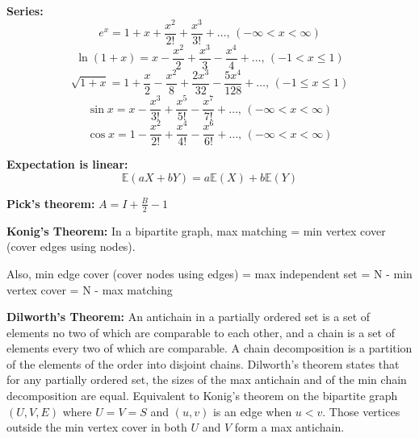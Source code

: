 \noindent
\textbf{Series:}
$$e^x = 1+x+\frac{x^2}{2!}+\frac{x^3}{3!}+\dots,\,(-\infty<x<\infty)$$
$$\ln(1+x) = x-\frac{x^2}{2}+\frac{x^3}{3}-\frac{x^4}{4}+\dots,\,(-1<x\leq1)$$
$$\sqrt{1+x} = 1+\frac{x}{2}-\frac{x^2}{8}+\frac{2x^3}{32}-\frac{5x^4}{128}+\dots,\,(-1\leq x\leq1)$$
$$\sin x = x-\frac{x^3}{3!}+\frac{x^5}{5!}-\frac{x^7}{7!}+\dots,\,(-\infty<x<\infty)$$
$$\cos x = 1-\frac{x^2}{2!}+\frac{x^4}{4!}-\frac{x^6}{6!}+\dots,\,(-\infty<x<\infty)$$

\noindent
\textbf{Expectation is linear:} \[\mathbb{E}(aX+bY) = a\mathbb{E}(X)+b\mathbb{E}(Y)\]

\noindent
\textbf{Pick's theorem:} $A=I+\frac{B}{2}-1$

\noindent
\textbf{Konig's Theorem:} In a bipartite graph, max matching = min vertex cover (cover edges using nodes).

\noindent
Also, min edge cover (cover nodes using edges) = max independent set = N - min vertex cover = N - max matching

\noindent
\textbf{Dilworth's Theorem:} An antichain in a partially ordered set is a set of elements no two of which are comparable to each other, and a chain is a set of elements every two of which are comparable. A chain decomposition is a partition of the elements of the order into disjoint chains. Dilworth's theorem states that for any partially ordered set, the sizes of the max antichain and of the min chain decomposition are equal. Equivalent to Konig's theorem on the bipartite graph $(U,V,E)$ where $U=V=S$ and $(u,v)$ is an edge when $u<v$. Those vertices outside the min vertex cover in both $U$ and $V$ form a max antichain.

